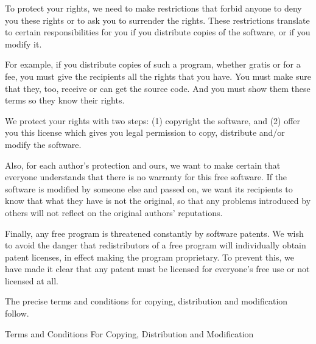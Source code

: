 \documentclass[12pt]{report}
\begin{document}
To protect your rights, we need to make restrictions that forbid anyone to
deny you these rights or to ask you to surrender the rights.  These
restrictions translate to certain responsibilities for you if you
distribute copies of the software, or if you modify it.

For example, if you distribute copies of such a program, whether gratis or
for a fee, you must give the recipients all the rights that you have.  You
must make sure that they, too, receive or can get the source code.  And
you must show them these terms so they know their rights.

We protect your rights with two steps: (1) copyright the software, and (2)
offer you this license which gives you legal permission to copy,
distribute and/or modify the software.

Also, for each author's protection and ours, we want to make certain that
everyone understands that there is no warranty for this free software.  If
the software is modified by someone else and passed on, we want its
recipients to know that what they have is not the original, so that any
problems introduced by others will not reflect on the original authors'
reputations.

Finally, any free program is threatened constantly by software patents.
We wish to avoid the danger that redistributors of a free program will
individually obtain patent licenses, in effect making the program
proprietary.  To prevent this, we have made it clear that any patent must
be licensed for everyone's free use or not licensed at all.

The precise terms and conditions for copying, distribution and
modification follow.

\begin{center}
{\Large \sc Terms and Conditions For Copying, Distribution and
  Modification}
\end{center}
\end{document}
